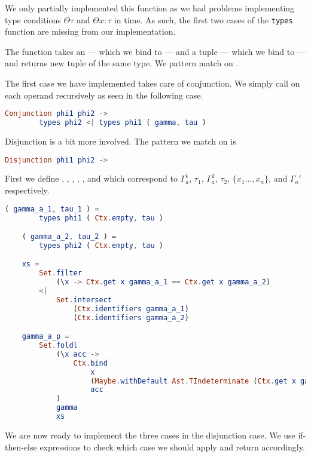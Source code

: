 We only partially implemented this function as we had problems implementing type
conditions $\Theta \tau$ and $\Theta x : \tau$ in time. As such, the first two
cases of the \texttt{types} function are missing from our implementation.

The  function takes an  --- which we bind to  --- and
a tuple  --- which we bind to  ---
and returns new tuple of the same type. We pattern match on .

The first case we have implemented takes care of conjunction. We simply call
 on each operand recursively as seen in the following case.

\begin{lstlisting}[language=elm,%
    gobble=4,%
    ]
    Conjunction phi1 phi2 ->
        types phi2 <| types phi1 ( gamma, tau )
\end{lstlisting}

Disjunction is a bit more involved. The pattern we match on is

\begin{lstlisting}[language=elm,%
    gobble=4,%
    ]
    Disjunction phi1 phi2 ->
\end{lstlisting}

First we define ,
, , , , and  which
correspond to $\Gamma_a^1$, $\tau_1$, $\Gamma_a^2$, $\tau_2$, $\{ x_1 ..., x_n
\}$, and $\Gamma_a '$ respectively.

\begin{lstlisting}[language=elm,%
    gobble=4,%
    ]
    ( gamma_a_1, tau_1 ) =
        types phi1 ( Ctx.empty, tau )

    ( gamma_a_2, tau_2 ) =
        types phi2 ( Ctx.empty, tau )

    xs =
        Set.filter
            (\x -> Ctx.get x gamma_a_1 == Ctx.get x gamma_a_2)
        <|
            Set.intersect
                (Ctx.identifiers gamma_a_1)
                (Ctx.identifiers gamma_a_2)

    gamma_a_p =
        Set.foldl
            (\x acc ->
                Ctx.bind
                    x
                    (Maybe.withDefault Ast.TIndeterminate (Ctx.get x gamma_a_1))
                    acc
            )
            gamma
            xs
\end{lstlisting}

We are now ready to implement the three cases in the disjunction case. We use
if-then-else expressions to check which case we should apply and return
accordingly.

